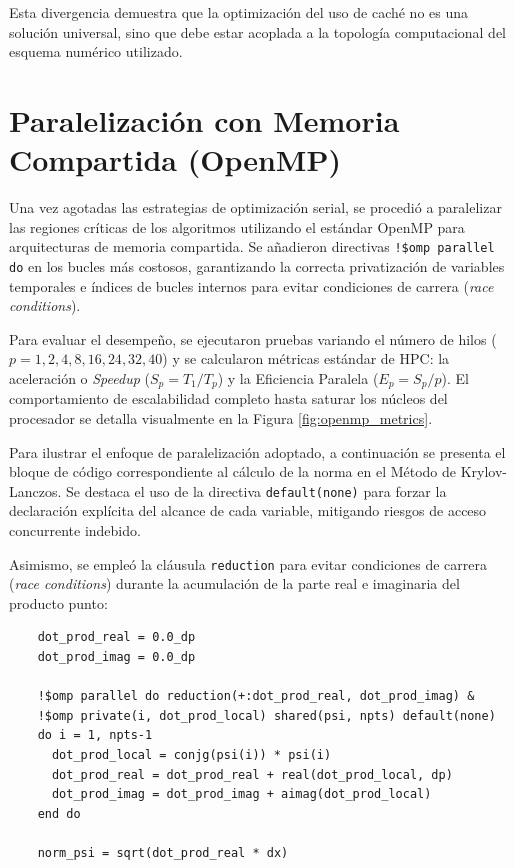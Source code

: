 \documentclass[12pt, a4paper]{article}
\begin{document}
Esta divergencia demuestra que la optimización del uso de caché no es una solución universal, sino que debe estar acoplada a la topología computacional del esquema numérico utilizado.

\section{Paralelización con Memoria Compartida (OpenMP)}
\label{sec:openmp}

Una vez agotadas las estrategias de optimización serial, se procedió a paralelizar las regiones críticas de los algoritmos utilizando el estándar OpenMP para arquitecturas de memoria compartida. Se añadieron directivas \texttt{!\$omp parallel do} en los bucles más costosos, garantizando la correcta privatización de variables temporales e índices de bucles internos para evitar condiciones de carrera (\textit{race conditions}).

Para evaluar el desempeño, se ejecutaron pruebas variando el número de hilos ($p = 1, 2, 4, 8, 16, 24, 32, 40$) y se calcularon métricas estándar de HPC: la aceleración o \textit{Speedup} ($S_p = T_1 / T_p$) y la Eficiencia Paralela ($E_p = S_p / p$). El comportamiento de escalabilidad completo hasta saturar los núcleos del procesador se detalla visualmente en la Figura \ref{fig:openmp_metrics}.

Para ilustrar el enfoque de paralelización adoptado, a continuación se presenta el bloque de código correspondiente al cálculo de la norma en el Método de Krylov-Lanczos. Se destaca el uso de la directiva \texttt{default(none)} para forzar la declaración explícita del alcance de cada variable, mitigando riesgos de acceso concurrente indebido.

Asimismo, se empleó la cláusula \texttt{reduction} para evitar condiciones de carrera (\textit{race conditions}) durante la acumulación de la parte real e imaginaria del producto punto:

\begin{verbatim}
    dot_prod_real = 0.0_dp
    dot_prod_imag = 0.0_dp

    !$omp parallel do reduction(+:dot_prod_real, dot_prod_imag) &
    !$omp private(i, dot_prod_local) shared(psi, npts) default(none)
    do i = 1, npts-1
      dot_prod_local = conjg(psi(i)) * psi(i)
      dot_prod_real = dot_prod_real + real(dot_prod_local, dp)
      dot_prod_imag = dot_prod_imag + aimag(dot_prod_local)
    end do

    norm_psi = sqrt(dot_prod_real * dx)
\end{verbatim}
\end{document}
